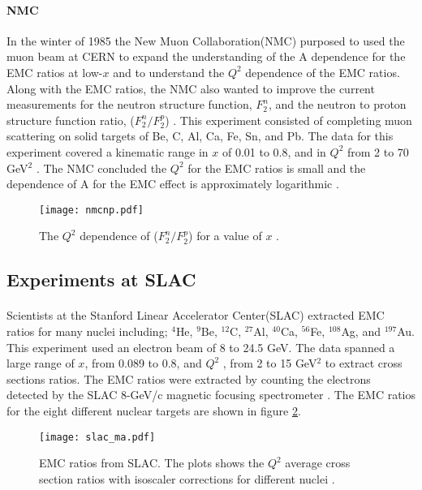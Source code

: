 \paragraph{NMC}In the winter of 1985 the New Muon Collaboration(NMC) purposed to used the muon beam at CERN to expand the understanding of the A dependence for the EMC ratios at low-$x$ and to understand the $Q^2$ dependence of the EMC ratios. Along with the EMC ratios, the NMC also wanted to improve the current measurements for the neutron structure function, $F_2^n$, and the neutron to proton structure function ratio, ($F_2^n/F_2^p$) \cite{NMCtech}. This experiment consisted of completing muon scattering on solid targets of Be, C, Al, Ca, Fe, Sn, and Pb. The data for this experiment covered a kinematic range in $x$ of 0.01 to 0.8, and in $Q^2$ from 2 to 70 GeV$^2$ \cite{ref:NMC}. The NMC concluded the $Q^2$ for the EMC ratios is small and the dependence of A for the EMC effect is approximately logarithmic \cite{ref:NMC,Ajth}. 

\begin{figure}[H]
	\centering
	\caption{The $Q^2$ dependence of ($F_2^n/F_2^p$) for a value of $x$ \cite{ref:NMC}.}
	\label{fig:nmcnp}
	\centering
	\texttt{[image: nmcnp.pdf]}
\end{figure}

\subsection{Experiments at SLAC}
\paragraph{}Scientists at the Stanford Linear Accelerator Center(SLAC) extracted EMC ratios for many nuclei including; $^4$He, $^9$Be, $^{12}$C, $^{27}$Al, $^{40}$Ca, $^{56}$Fe, $^{108}$Ag, and $^{197}$Au. This experiment used an electron beam of 8 to 24.5 GeV. The data spanned a large range of $x$, from 0.089 to 0.8, and $Q^2$ , from 2 to 15 GeV$^2$ to extract cross sections ratios. The EMC ratios were extracted by counting the electrons detected by the SLAC 8-GeV/c magnetic focusing spectrometer \cite{gomez}. The EMC ratios for the eight different nuclear targets are shown in figure \ref{gomez_ma}.
\begin{figure}[t]
	\centering
	\caption{EMC ratios from SLAC. The plots shows the $Q^2$ average cross section ratios with isoscaler corrections for different nuclei \cite{gomez}.}
	\label{gomez_ma}
	\texttt{[image: slac\_ma.pdf]} 
\end{figure} 
